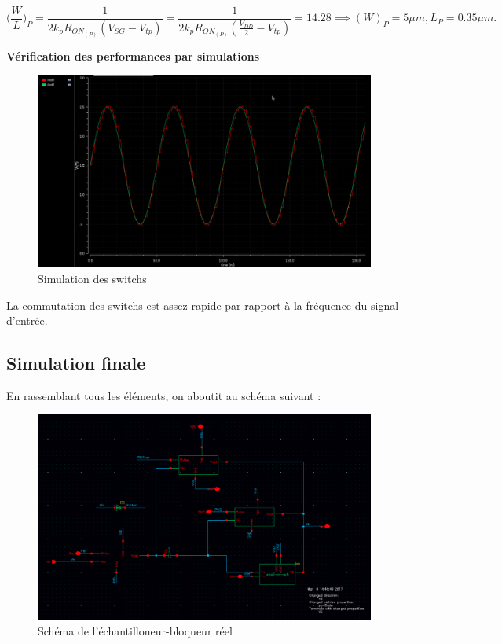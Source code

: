 \documentclass[11pt]{article}
\begin{document}
\[
\bigg(\frac{W}{L}\bigg)_{P} = \frac{1}{2k_p R_{ON_{(P)}}  (V_{SG} - V_{tp})} = \frac{1}{2k_p R_{ON_{(P)}}  (\frac{V_{DD}}{2} - V_{tp})} = 14.28 \implies (W)_{P} = 5 \mu m,  L_{P} = 0.35 \mu m.
\]

\textbf{V\'erification des performances par simulations}

\begin{figure}[!htb]
\begin{center}
  \includegraphics[width=0.8\linewidth]{switchs_simu.png}
  \caption{Simulation des switchs}
\end{center}
\end{figure}

La commutation des switchs est assez rapide par rapport \`a la fr\'equence du signal d'entr\'ee.

\clearpage

\subsection{Simulation finale}
En rassemblant tous les \'el\'ements, on aboutit au sch\'ema suivant :

\begin{figure}[!htb]
\begin{center}
  \includegraphics[width=0.80\linewidth]{EB-Schematic.png}
  \caption{Sch\'ema de l'\'echantilloneur-bloqueur r\'eel}
\end{center}
\end{figure}
\end{document}
